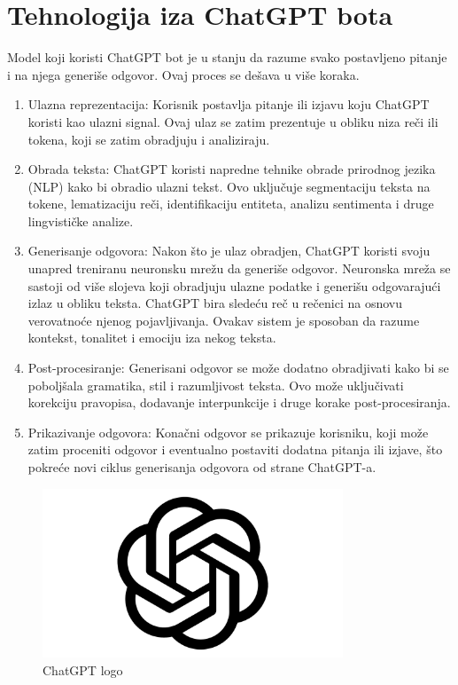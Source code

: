 \documentclass[fleqn, 12pt]{article}
\begin{document}
\section{Tehnologija iza ChatGPT bota}
\begin{text}
Model koji koristi ChatGPT bot je u stanju da razume svako postavljeno pitanje i na njega generiše odgovor. Ovaj proces se dešava u više koraka.
\end{text}
\begin{enumerate}
\item Ulazna reprezentacija: Korisnik postavlja pitanje ili izjavu koju ChatGPT koristi kao ulazni signal. Ovaj ulaz se zatim prezentuje u obliku niza reči ili tokena, koji se zatim obradjuju i analiziraju. \cite{G4}
\item Obrada teksta: ChatGPT koristi napredne tehnike obrade prirodnog jezika (NLP) kako bi obradio ulazni tekst. Ovo uključuje segmentaciju teksta na tokene, lematizaciju reči, identifikaciju entiteta, analizu sentimenta i druge lingvističke analize.\cite{G4}
\item Generisanje odgovora: Nakon što je ulaz obradjen, ChatGPT koristi svoju unapred treniranu neuronsku mrežu da generiše odgovor. Neuronska mreža se sastoji od više slojeva koji obradjuju ulazne podatke i generišu odgovarajući izlaz u obliku teksta. ChatGPT bira sledeću reč u rečenici na osnovu verovatnoće njenog pojavljivanja. Ovakav sistem je sposoban da razume kontekst, tonalitet i emociju iza nekog teksta.\cite{G4}
\item Post-procesiranje: Generisani odgovor se može dodatno obradjivati kako bi se poboljšala gramatika, stil i razumljivost teksta. Ovo može uključivati korekciju pravopisa, dodavanje interpunkcije i druge korake post-procesiranja.\cite{G4}
\item Prikazivanje odgovora: Konačni odgovor se prikazuje korisniku, koji može zatim proceniti odgovor i eventualno postaviti dodatna pitanja ili izjave, što pokreće novi ciklus generisanja odgovora od strane ChatGPT-a.\cite{G4}
\end{enumerate}

\begin{figure}[h!]
    \centering
    \includegraphics[width=0.8\textwidth]{ChatGPT-Logo.png}
    \caption{ChatGPT logo}
\end{figure}
\end{document}
